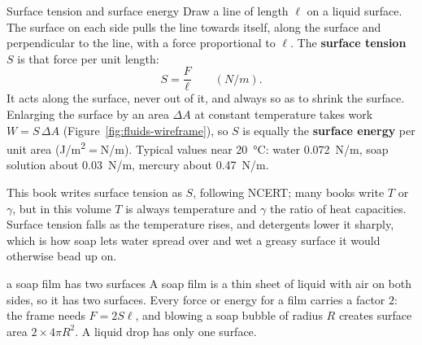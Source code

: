 \begin{figure}[htbp]
\centering
{}
\end{figure}

\begin{defbox}{Surface tension and surface energy}
Draw a line of length $\ell$ on a liquid surface. The surface on each side pulls the line towards itself,
along the surface and perpendicular to the line, with a force proportional to $\ell$. The \textbf{surface
tension} $S$ is that force per unit length:
\[
S=\frac{F}{\ell}\qquad(\si{N/m}).
\]
It acts along the surface, never out of it, and always so as to shrink the surface. Enlarging the surface
by an area $\Delta A$ at constant temperature takes work $W=S\,\Delta A$
(Figure~\ref{fig:fluids-wireframe}), so $S$ is equally the \textbf{surface energy} per unit area
(\si{J/m^2}$=$\si{N/m}). Typical values near \SI{20}{\celsius}: water \SI{0.072}{N/m}, soap solution
about \SI{0.03}{N/m}, mercury about \SI{0.47}{N/m}.
\end{defbox}


This book writes surface tension as $S$, following NCERT; many books write $T$ or $\gamma$, but in this
volume $T$ is always temperature and $\gamma$ the ratio of heat capacities. Surface tension falls as the
temperature rises, and detergents lower it sharply, which is how soap lets water spread over and wet a
greasy surface it would otherwise bead up on.

\begin{trapbox}{a soap film has two surfaces}
A soap film is a thin sheet of liquid with air on both sides, so it has two surfaces. Every force or energy
for a film carries a factor $2$: the frame needs $F=2S\ell$, and blowing a soap bubble of radius $R$
creates surface area $2\times4\pi R^2$. A liquid drop has only one surface.
\end{trapbox}

